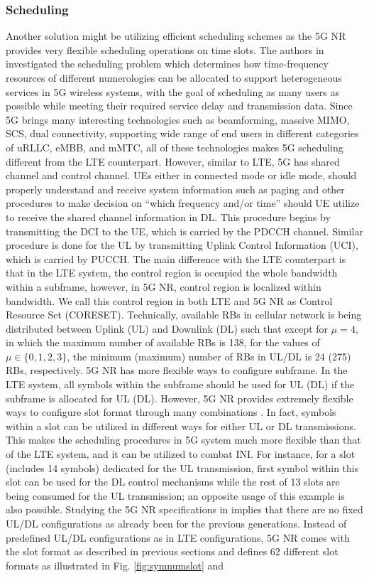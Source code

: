 \documentclass[journal,draftclsnofoot,onecolumn,12pt]{IEEEtran}
\theoremstyle{definition}
\begin{document}
\subsubsection{Scheduling}
\cite{num_scheduling}
Another solution might be utilizing efficient scheduling schemes as the 5G NR provides very flexible scheduling operations on time slots. The authors in \cite{num_scheduling} investigated the scheduling problem which determines how time-frequency resources of different numerologies can be allocated to support heterogeneous services in 5G wireless systems, with the goal of scheduling as many users as possible while meeting their required service delay and transmission data. Since 5G brings many interesting technologies such as beamforming, massive MIMO, SCS, dual connectivity, supporting wide range of end users in different categories of uRLLC, eMBB, and mMTC, all of these technologies makes 5G scheduling different from the LTE counterpart. However, similar to LTE, 5G has shared channel and control channel. UEs either in connected mode or idle mode, should properly understand and receive system information such as paging and other procedures to make decision on ``which frequency and/or time'' should UE utilize to receive the shared channel information in DL. This procedure begins by transmitting the DCI to the UE, which is carried by the PDCCH channel. Similar procedure is done for the UL by transmitting Uplink Control Information (UCI), which is carried by PUCCH. The main difference with the LTE counterpart is that in the LTE system, the control region is occupied the whole bandwidth within a subframe, however, in 5G NR, control region is localized within bandwidth. We call this control region in both LTE and 5G NR as Control Resource Set (CORESET). Technically, available RBs in cellular network is being distributed between Uplink (UL) and Downlink (DL) such that except for $\mu=4$, in which the maximum number of available RBs is 138, for the values of $\mu \in \{0,1,2,3\}$, the minimum (maximum) number of RBs in UL/DL is 24 (275) RBs, respectively. 5G NR has more flexible ways to configure subframe. In the LTE system, all symbols within the subframe should be used for UL (DL) if the subframe is allocated for UL (DL). However, 5G NR provides extremely flexible ways to configure slot format through many combinations \cite{5GNR_MAC,5GNR_Mod,5GNR_PHY}. In fact, symbols within a slot can be utilized in different ways for either UL or DL transmissions. This makes the scheduling procedures in 5G system much more flexible than that of the LTE system, and it can be utilized to combat INI. For instance, for a slot (includes 14 symbols) dedicated for the UL transmission, first symbol within this slot can be used for the DL control mechanisms while the rest of 13 slots are being consumed for the UL transmission; an opposite usage of this example is also possible. Studying the 5G NR specifications in \cite{3GPP_Rel17} implies that there are no fixed UL/DL configurations as already been for the previous generations. Instead of predefined UL/DL configurations as in LTE configurations, 5G NR comes with the slot format as described in previous sections and defines 62 different slot formats as illustrated in Fig. \ref{fig:symnumslot} and 
\end{document}
